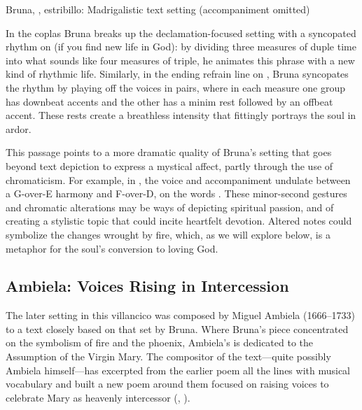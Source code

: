 
\begin{musicexample}
    \caption{Bruna, , estribillo: Madrigalistic text
    setting (accompaniment omitted)}
    \label{mus:Bruna-Suban_las_voces-estribillo}
\end{musicexample}

In the coplas Bruna breaks up the declamation-focused setting with a syncopated
rhythm on  (if you find new life in God):
by dividing three measures of duple time into what sounds like four measures of
triple, he animates this phrase with a new kind of rhythmic life. 
Similarly, in the ending refrain line on , Bruna syncopates the
rhythm by playing off the voices in pairs, where in each measure one group has
downbeat accents and the other has a minim rest followed by an offbeat accent.
These rests create a breathless intensity that fittingly portrays the soul in
ardor.


This passage points to a more dramatic quality of Bruna's setting that goes
beyond text depiction to express a mystical affect, partly through the use of
chromaticism.
For example, in , the voice and accompaniment undulate between a
G-over-E\fl{} harmony and F\sh-over-D, on the words .
These minor-second gestures and chromatic alterations may be
ways of depicting spiritual passion, and of creating a stylistic topic that
could incite heartfelt devotion.
Altered notes could symbolize the changes wrought by fire, which, as we will
explore below, is a metaphor for the soul's conversion to loving God.  


\subsection{Ambiela: Voices Rising in Intercession}

The later setting in this villancico was composed by Miguel Ambiela
(1666--1733) to a text closely based on that set by Bruna.
Where Bruna's piece concentrated on the symbolism of fire and the phoenix,
Ambiela's is dedicated to the Assumption of the Virgin Mary.
The compositor of the text---quite possibly Ambiela himself---has excerpted
from the earlier poem all the lines with musical vocabulary and built a new
poem around them focused on raising voices to celebrate Mary as heavenly
intercessor (, ).

